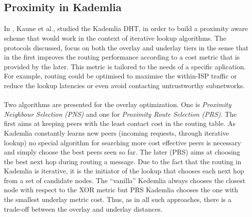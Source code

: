 \documentclass[a4paper,10pt]{article}
\begin{document}
\subsection{Proximity in Kademlia}

\paragraph{}
In \cite{kaune_pkad_2008}, Kaune et al., studied the Kademlia DHT, in order to build a proximity aware scheme that would work in the context of iterative lookup algorithms. The protocols discussed, focus on both the overlay and underlay tiers in the sense that in the first improves the routing performance according to a cost metric that is provided by the later. This metric is tailored to the needs of a specific aplication. For example, routing could be optimised to maximise the within-ISP traffic or reduce the lookup latencies or even avoid contacting untrustworthy subnetworks.

\paragraph{}
Two algorithms are presented for the overlay optimization. One is \emph{Proximity Neighbour Selection (PNS)} and one for \emph{Proximity Route Selection (PRS)}. The first aims at keeping peers with the least contact cost in the routing table. As Kademlia constantly learns new peers (incoming requests, through iterative lookup) no special algorithm for searching more cost effective peers is necessary and simply choose the best peers seen so far. The later (PRS) aims at choosing the best next hop during routing a message. Due to the fact that the routing in Kademlia is iterative, it is the initiator of the lookup that chooses each next hop from a set of candidate nodes. The ``vanilla'' Kedemlia always chooses the closest node with respect to the XOR metric but PRS Kademlia chooses the one with the smallest underlay metric cost. Thus, as in all such approaches, there is a trade-off between the overlay and underlay distances.
\end{document}
